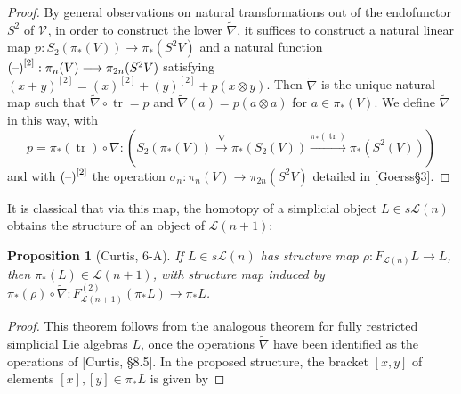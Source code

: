 \documentclass[11pt]{amsart}
\theoremstyle{plain}
\newtheorem{prop}[thm]{Proposition}
\theoremstyle{definition}
\DeclareMathOperator{\trace}{tr}
\newcommand{\DASH}{\textup{--}}
\renewcommand{\to}{\longrightarrow}
\newcommand{\calL}{\mathcal{L}}
\newcommand{\calV}{\mathcal{V}}
\theoremstyle{plain}
\newcommand{\restn}[1]{{#1}^{[2]}}
\newcommand{\vect}[2]{\calV^{#1}_{#2}}
\newcommand{\F}{\mathbb{F}}
\begin{document}
\begin{Lie algebras in characteristic 2 and their homotopy operations}
\begin{proof}
By general observations on natural transformations out of the endofunctor $S^2$ of $\vect{}{}$, in order to construct the lower $\widetilde{\nabla}$, it suffices to construct a natural linear map $p:S_2(\pi_*(V))\to \pi_*(S^2V)$ and a natural function $\restn{(\DASH)}:\pi_n(V)\to \pi_{2n}(S^2V)$ satisfying $\restn{(x+y)}=\restn{(x)}+\restn{(y)}+p(x\otimes y)$. Then $\widetilde{\nabla}$ is the unique natural map such that $\widetilde{\nabla}\circ\trace=p$ and $\widetilde{\nabla}(a)=p(a\otimes a)$ for $a\in\pi_*\left(V\right)$.
We define $\widetilde{\nabla}$ in this way, with
\[p=\pi_*(\trace)\circ\nabla:\left(S_2(\pi_*(V))\overset{\nabla}{\to}\pi_*(S_2(V))\overset{\pi_*(\trace)}{\to}\pi_*(S^2(V))\right)\]
and with $\restn{(\DASH)}$ the operation $\sigma_n:\pi_n(V)\to \pi_{2n}(S^2V)$ detailed in [Goerss\S3].
%
\end{proof}
It is classical that via this map, the homotopy of a simplicial object $L\in s\calL(n)$ obtains the structure of an object of $\calL(n+1)$:
\begin{prop}[Curtis, 6-A]
If $L\in s\calL(n)$ has structure map $\rho:F_{\calL(n)}L\to L$, then $\pi_*(L)\in\calL(n+1)$, with structure map induced by $\pi_*(\rho)\circ\widetilde{\nabla}:F^{(2)}_{\calL(n+1)}(\pi_*L)\to \pi_*L$.
\end{prop}
\begin{proof}
This theorem follows from the analogous theorem for fully restricted simplicial Lie algebras $L$, once the operations $\widetilde{\nabla}$ have been identified as the operations of [Curtis, \S8.5]. In the proposed structure, the bracket $[x,y]$ of elements $[x],[y]\in\pi_*L$ is given by

\end{proof}
\end{Lie algebras in characteristic 2 and their homotopy operations}
\end{document}
